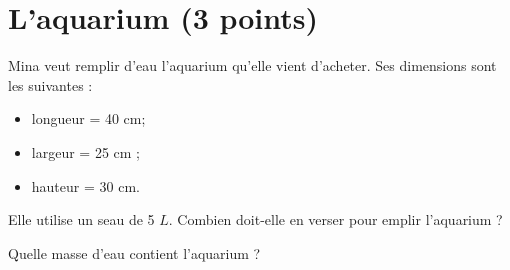 \section{L'aquarium (3 points)}

Mina veut remplir d'eau l'aquarium qu'elle vient d'acheter. Ses dimensions sont les suivantes :
\begin{itemize}
	\item longueur = 40 cm;
	\item largeur = 25 cm ;
	\item hauteur = 30 cm.
\end{itemize} 
\begin{questions}
	\question[2] Elle utilise un seau de 5 $L$. Combien doit-elle en verser pour emplir l'aquarium ?
	\begin{solution}
	\end{solution}
	
	\question[1] Quelle masse d'eau contient l'aquarium ?
	\begin{solution}
		
	\end{solution}
\end{questions}